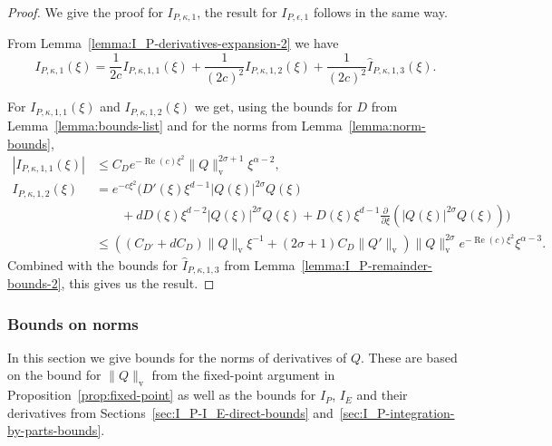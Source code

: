 \documentclass[11pt]{article}
\DeclareMathOperator{\real}{Re}
\newcommand{\normv}{\mathrm{v}}
\begin{document}
\begin{proof}
  We give the proof for \(I_{P,\kappa,1}\), the result for
  \(I_{P,\epsilon,1}\) follows in the same way.

  From Lemma~\ref{lemma:I_P-derivatives-expansion-2} we have
  \begin{equation}
    I_{P,\kappa,1}(\xi) =
    \frac{1}{2c}I_{P,\kappa,1,1}(\xi)
    + \frac{1}{(2c)^{2}}I_{P,\kappa,1,2}(\xi)
    + \frac{1}{(2c)^{2}}\hat{I}_{P,\kappa,1,3}(\xi).
  \end{equation}

  For \(I_{P,\kappa,1,1}(\xi)\) and \(I_{P,\kappa,1,2}(\xi)\) we get,
  using the bounds for \(D\) from Lemma~\ref{lemma:bounds-list} and
  for the norms from Lemma~\ref{lemma:norm-bounds},
  \begin{align*}
    |I_{P,\kappa,1,1}(\xi)|
    &\leq C_{D}e^{-\real(c)\xi^{2}}
    \|Q\|_{\normv}^{2\sigma + 1}\xi^{\alpha - 2},\\
    I_{P,\kappa,1,2}(\xi)
    &= e^{-c\xi^{2}}\Big(
      D'(\xi)\xi^{d - 1}|Q(\xi)|^{2\sigma}Q(\xi)\\
    &\qquad+ d D(\xi)\xi^{d - 2}|Q(\xi)|^{2\sigma}Q(\xi)
      + D(\xi)\xi^{d - 1}\frac{\partial}{\partial \xi}\left(|Q(\xi)|^{2\sigma}Q(\xi)\right)
      \Big)\\
    &\leq \left(
      (C_{D'} + dC_{D})\|Q\|_{\normv}\xi^{-1}
      + (2\sigma + 1)C_{D}\|Q'\|_{\normv}
      \right)
    \|Q\|_{\normv}^{2\sigma}e^{-\real(c)\xi^{2}}\xi^{\alpha - 3}.
  \end{align*}
  Combined with the bounds for \(\hat{I}_{P,\kappa,1,3}\) from
  Lemma~\ref{lemma:I_P-remainder-bounds-2}, this gives us the result.
\end{proof}

\subsubsection{Bounds on norms}
\label{sec:bounds-on-norms}
In this section we give bounds for the norms of derivatives of \(Q\).
These are based on the bound for \(\|Q\|_{\normv}\) from the
fixed-point argument in Proposition~\ref{prop:fixed-point} as well as
the bounds for \(I_{P}\), \(I_{E}\) and their derivatives from
Sections~\ref{sec:I_P-I_E-direct-bounds}
and~\ref{sec:I_P-integration-by-parts-bounds}.
\end{document}
